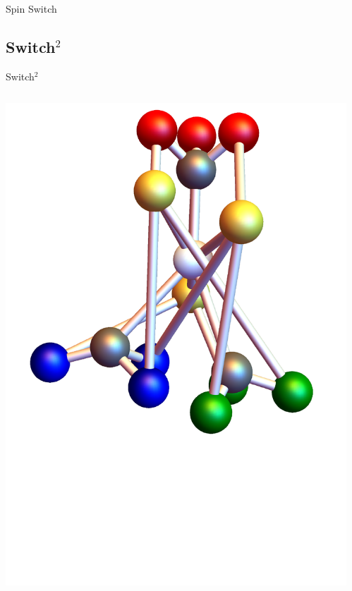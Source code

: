 \documentclass{beamer}
\begin{document}
\begin{frame}{Spin Switch}
\end{frame}

\subsection{Switch$^2$}
\begin{frame}{Switch$^2$}
	\begin{columns}[T]
		\begin{column}{0.5\textwidth}
			\centering
   			\includegraphics[trim=0mm 0 0 0mm, width=1.2\textwidth]{Images/switch_square}
		\end{column}
		\begin{column}{0.5\textwidth}
			\centering
    		\begin{itemize}

\end{itemize}
\end{column}
\end{columns}
\end{frame}
\end{document}
